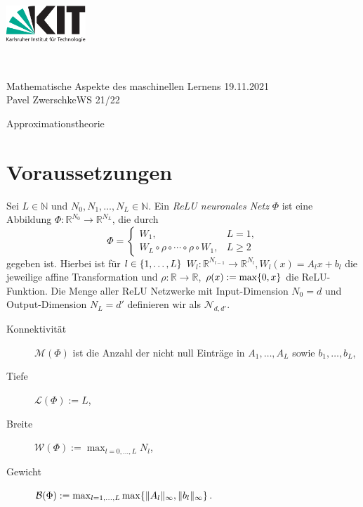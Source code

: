\documentclass[11pt]{scrartcl}
\def\Semester{WS 21/22}
\def\Seminar{Mathematische Aspekte des maschinellen Lernens}
\def\Title{Approximationstheorie}
\def\Author{Pavel Zwerschke}
\def\Date{19.11.2021} %
\newcommand{\N}{\mathbb{N}} %
\newcommand{\R}{\mathbb{R}} %
\newcommand{\norm}[1]{\| #1 \|}
\begin{document}
\vspace*{-2cm}
\begin{minipage}{3cm}
    \includegraphics[width=3cm]{./logos/kit-de.pdf} %
\end{minipage}\hspace*{0.2cm}~
\begin{minipage}{14cm}{
        \sffamily \Large{\Seminar} \hfill \Date \\ 
        \Author \hfill \Semester
}\end{minipage}
\vspace{-0.5cm}
\begin{center}
    \huge \sffamily \Title
\end{center}
\vspace{-1cm}

\section{Voraussetzungen}
\label{sec:prerequisites}

\begin{definition}
    Sei \(L \in \N\) und \(N_0, N_1, \ldots, N_L \in \N\). Ein 
    \textit{ReLU neuronales Netz} \(\Phi\) ist eine Abbildung 
    \(\Phi: \R^{N_0} \rightarrow \R^{N_L}\), die durch 
    \[ \Phi = \begin{cases}
        W_1, & L = 1, \\
        W_L \circ \rho \circ \cdots \circ \rho \circ W_1, & L \geq 2
    \end{cases} \]
    gegeben ist. Hierbei ist für \(l\in \{1,\ldots, L\}\) \(W_l : \R^{N_{l-1}} \rightarrow \R^{N_l}, W_l(x) = A_l x + b_l\) 
    die jeweilige affine Transformation und \(\rho: \R \rightarrow \R\), \(\rho(x) := \max\{0, x\}\) 
    die ReLU-Funktion.
    Die Menge aller ReLU Netzwerke mit Input-Dimension \(N_0 = d\) und Output-Dimension \(N_L = d'\) 
    definieren wir als \(\mathcal{N}_{d,d'}\).
\end{definition}

\begin{definition}\leavevmode
    \begin{description}
        \item[Konnektivität] \(\mathcal{M}(\Phi)\) ist die Anzahl der nicht null Einträge in \(A_1, \ldots, A_L\) 
        sowie \(b_1, \ldots, b_L\),
        \item[Tiefe] \(\mathcal{L}(\Phi) := L\),
        \item[Breite] \(\mathcal{W}(\Phi) := \max_{l=0,\ldots, L} N_l\),
        \item[Gewicht] \(\mathcal{B}(\Phi) := \max_{l=1,\ldots, L} \max\set{\norm{A_l}_\infty, \norm{b_l}_\infty}\).
    \end{description}
\end{definition}
\end{document}
